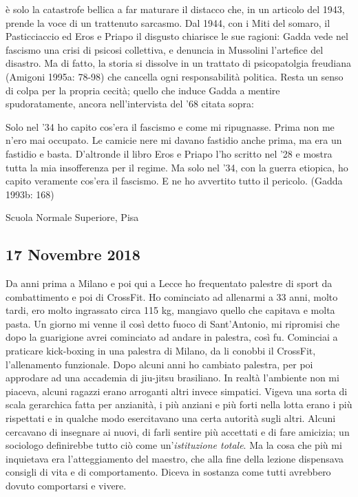 è solo la catastrofe bellica a far maturare il distacco che, in un articolo del 1943, prende la voce di un trattenuto sarcasmo. Dal 1944, con i Miti del somaro, il Pasticciaccio ed Eros e Priapo il disgusto chiarisce le sue ragioni: Gadda vede nel fascismo una crisi di psicosi collettiva, e denuncia in Mussolini l’artefice del disastro. Ma di fatto, la storia si dissolve in un trattato di psicopatolgia freudiana (Amigoni 1995a: 78-98) che cancella ogni responsabilità politica. Resta un senso di colpa per la propria cecità; quello che induce Gadda a mentire spudoratamente, ancora nell’intervista del ’68 citata sopra:

Solo nel ’34 ho capito cos’era il fascismo e come mi ripugnasse. Prima non me n’ero mai occupato. Le camicie nere mi davano fastidio anche prima, ma era un fastidio e basta. D’altronde il libro Eros e Priapo l’ho scritto nel ’28 e mostra tutta la mia insofferenza per il regime. Ma solo nel ’34, con la guerra etiopica, ho capito veramente cos’era il fascismo. E ne ho avvertito tutto il pericolo. (Gadda 1993b: 168)

Scuola Normale Superiore, Pisa
\subsection{17 Novembre 2018}
Da anni prima a Milano e poi qui a Lecce ho frequentato palestre di sport da combattimento e poi di CrossFit. Ho cominciato ad allenarmi a 33 anni, molto tardi, ero molto ingrassato circa 115 kg, mangiavo quello che capitava e molta pasta. Un giorno mi venne il così detto fuoco di Sant'Antonio, mi ripromisi che dopo la guarigione avrei cominciato ad andare in palestra, così fu. Cominciai a praticare kick-boxing in una palestra di Milano, da li conobbi il CrossFit, l'allenamento funzionale. Dopo alcuni anni ho cambiato palestra, per poi approdare ad una accademia di jiu-jitsu brasiliano.
In realtà l'ambiente non mi piaceva, alcuni ragazzi erano arroganti altri invece simpatici. Vigeva una sorta di scala gerarchica fatta per anzianità, i più anziani e più forti nella lotta erano i più rispettati e in qualche modo esercitavano una certa autorità sugli altri. Alcuni cercavano di insegnare ai nuovi, di farli sentire più accettati e di fare amicizia; un sociologo definirebbe tutto ciò come un'\emph{istituzione totale}.\newline
Ma la cosa che più mi inquietava era l'atteggiamento del maestro, che alla fine della lezione dispensava consigli di vita e di comportamento. Diceva in sostanza come tutti avrebbero dovuto comportarsi e vivere.